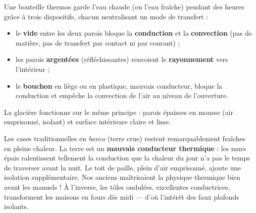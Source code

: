 \documentclass[11pt]{article}
\begin{document}
\begin{exemplebox}
Une bouteille thermos garde l'eau chaude (ou l'eau fraîche) pendant des heures grâce à trois dispositifs, chacun neutralisant un mode de transfert :
\begin{itemize}
\item le \textbf{vide} entre les deux parois bloque la \textbf{conduction} et la \textbf{convection} (pas de matière, pas de transfert par contact ni par courant) ;
\item les parois \textbf{argentées} (réfléchissantes) renvoient le \textbf{rayonnement} vers l'intérieur ;
\item le \textbf{bouchon} en liège ou en plastique, mauvais conducteur, bloque la conduction et empêche la convection de l'air au niveau de l'ouverture.
\end{itemize}
La glacière fonctionne sur le même principe : parois épaisses en mousse (air emprisonné, isolant) et surface intérieure claire et lisse.
\end{exemplebox}

\begin{savaistu}
Les cases traditionnelles en \emph{banco} (terre crue) restent remarquablement fraîches en pleine chaleur. La terre est un \textbf{mauvais conducteur thermique} : les murs épais ralentissent tellement la conduction que la chaleur du jour n'a pas le temps de traverser avant la nuit. Le toit de paille, plein d'air emprisonné, ajoute une isolation supplémentaire. Nos anciens maîtrisaient la physique thermique bien avant les manuels ! À l'inverse, les tôles ondulées, excellentes conductrices, transforment les maisons en fours dès midi — d'où l'intérêt des faux plafonds isolants.
\end{savaistu}
\end{document}
